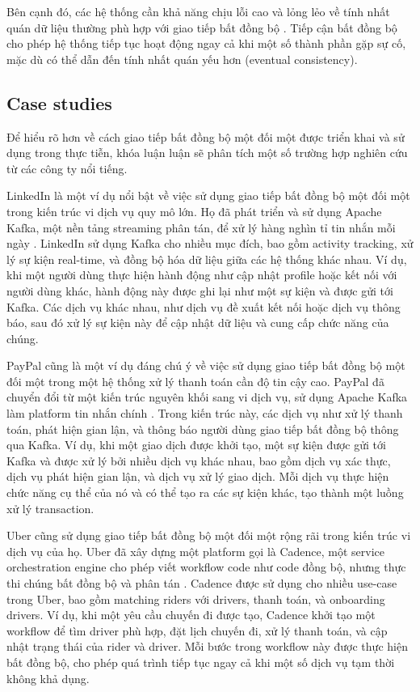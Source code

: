 Bên cạnh đó, các hệ thống cần khả năng chịu lỗi cao và lỏng lẻo về tính nhất quán dữ liệu thường phù hợp với giao tiếp bất đồng bộ \cite{fowler2002}. Tiếp cận bất đồng bộ cho phép hệ thống tiếp tục hoạt động ngay cả khi một số thành phần gặp sự cố, mặc dù có thể dẫn đến tính nhất quán yếu hơn (eventual consistency).

\subsection{Case studies}
Để hiểu rõ hơn về cách giao tiếp bất đồng bộ một đối một được triển khai và sử dụng trong thực tiễn, khóa luận luận sẽ phân tích một số trường hợp nghiên cứu từ các công ty nổi tiếng.

LinkedIn là một ví dụ nổi bật về việc sử dụng giao tiếp bất đồng bộ một đối một trong kiến trúc vi dịch vụ quy mô lớn. Họ đã phát triển và sử dụng Apache Kafka, một nền tảng streaming phân tán, để xử lý hàng nghìn tỉ tin nhắn mỗi ngày \cite{goodhope2012}. LinkedIn sử dụng Kafka cho nhiều mục đích, bao gồm activity tracking, xử lý sự kiện real-time, và đồng bộ hóa dữ liệu giữa các hệ thống khác nhau. Ví dụ, khi một người dùng thực hiện hành động như cập nhật profile hoặc kết nối với người dùng khác, hành động này được ghi lại như một sự kiện và được gửi tới Kafka. Các dịch vụ khác nhau, như dịch vụ đề xuất kết nối hoặc dịch vụ thông báo, sau đó xử lý sự kiện này để cập nhật dữ liệu và cung cấp chức năng của chúng.

PayPal cũng là một ví dụ đáng chú ý về việc sử dụng giao tiếp bất đồng bộ một đối một trong một hệ thống xử lý thanh toán cần độ tin cậy cao. PayPal đã chuyển đổi từ một kiến trúc nguyên khối sang vi dịch vụ, sử dụng Apache Kafka làm platform tin nhắn chính \cite{raman2016}. Trong kiến trúc này, các dịch vụ như xử lý thanh toán, phát hiện gian lận, và thông báo người dùng giao tiếp bất đồng bộ thông qua Kafka. Ví dụ, khi một giao dịch được khởi tạo, một sự kiện được gửi tới Kafka và được xử lý bởi nhiều dịch vụ khác nhau, bao gồm dịch vụ xác thực, dịch vụ phát hiện gian lận, và dịch vụ xử lý giao dịch. Mỗi dịch vụ thực hiện chức năng cụ thể của nó và có thể tạo ra các sự kiện khác, tạo thành một luồng xử lý transaction.

Uber cũng sử dụng giao tiếp bất đồng bộ một đối một rộng rãi trong kiến trúc vi dịch vụ của họ. Uber đã xây dựng một platform gọi là Cadence, một service orchestration engine cho phép viết workflow code như code đồng bộ, nhưng thực thi chúng bất đồng bộ và phân tán \cite{fateev2017}. Cadence được sử dụng cho nhiều use-case trong Uber, bao gồm matching riders với drivers, thanh toán, và onboarding drivers. Ví dụ, khi một yêu cầu chuyến đi được tạo, Cadence khởi tạo một workflow để tìm driver phù hợp, đặt lịch chuyến đi, xử lý thanh toán, và cập nhật trạng thái của rider và driver. Mỗi bước trong workflow này được thực hiện bất đồng bộ, cho phép quá trình tiếp tục ngay cả khi một số dịch vụ tạm thời không khả dụng.

